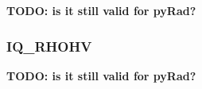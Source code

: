 \documentclass[a4paper,11pt,pdftex,twoside]{scrartcl}
\renewcommand{\bf}{\normalfont \bfseries}
\begin{document}
{{{{\bf TODO: is it still valid for pyRad?}


%

\subsubsection{IQ\_RHOHV}
\label{subsec_iq_rhohv}

{\bf TODO: is it still valid for pyRad?}


%
%


}}}
\end{document}
